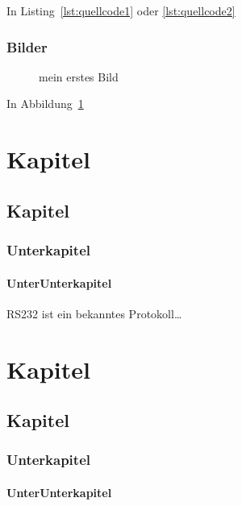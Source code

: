 \documentclass{scrbook}
\begin{document}
In Listing~\ref{lst:quellcode1} oder \ref{lst:quellcode2} 

\subsection{Bilder}

\begin{figure}[htb]
\centering
\caption{mein erstes Bild}
\label{fig:meinerstesBild}
\end{figure}

In Abbildung~\ref{fig:meinerstesBild}
\chapter{Kapitel}
\section{Kapitel}
\subsection{Unterkapitel}
\subsubsection{UnterUnterkapitel}
RS232 ist ein bekanntes Protokoll\cite{wiki:rs232}\ldots

\chapter{Kapitel}
\section{Kapitel}
\subsection{Unterkapitel}
\subsubsection{UnterUnterkapitel}


\end{document}
